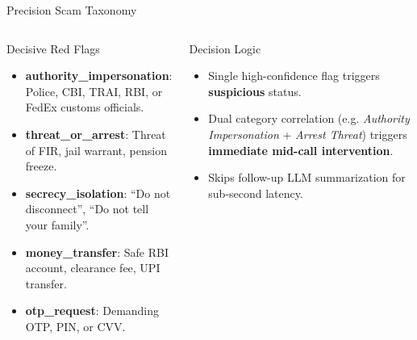 \documentclass[aspectratio=169,10pt]{beamer}
\begin{document}
\begin{frame}{Precision Scam Taxonomy}
\begin{columns}[T]
\begin{block}{Decisive Red Flags}
\begin{itemize}
    \item \textbf{authority\_impersonation}: Police, CBI, TRAI, RBI, or FedEx customs officials.
    \item \textbf{threat\_or\_arrest}: Threat of FIR, jail warrant, pension freeze.
    \item \textbf{secrecy\_isolation}: ``Do not disconnect'', ``Do not tell your family''.
    \item \textbf{money\_transfer}: Safe RBI account, clearance fee, UPI transfer.
    \item \textbf{otp\_request}: Demanding OTP, PIN, or CVV.
\end{itemize}
\end{block}

\begin{alertblock}{Decision Logic}
\begin{itemize}
    \item Single high-confidence flag triggers \textbf{suspicious} status.
    \item Dual category correlation (e.g. \textit{Authority Impersonation} + \textit{Arrest Threat}) triggers \textbf{immediate mid-call intervention}.
    \item Skips follow-up LLM summarization for sub-second latency.
\end{itemize}
\end{alertblock}
\end{columns}
\end{frame}
\end{document}
